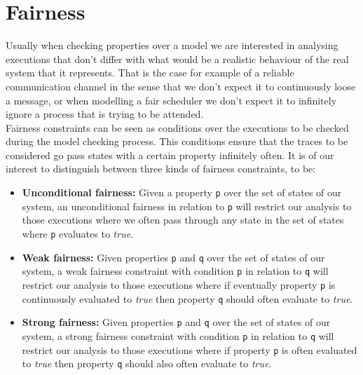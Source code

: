 \documentclass[12pt]{llncs2e/llncs}
\begin{document}


\section{Fairness}\label{fairness}

Usually when checking properties over a model we are interested in analysing 
executions that don't differ with what would be a realistic behaviour of the
real system that it represents. That is the case for example of a reliable
communication channel in the sense that we don't expect it to continuously
loose a message, or when modelling a fair scheduler we don't expect it to
infinitely ignore a process that is trying to be attended.\\
Fairness constraints can be seen as conditions over the executions to be checked
during the model checking process. This conditions ensure that the traces
to be considered go pass states with a certain property infinitely often.
It is of our interest to distinguish between three kinds of fairness
constraints, to be:
\begin{itemize}
\item \textbf{Unconditional fairness:} Given a property \texttt{p} over the
set of states of our system, an unconditional fairness in relation to
\texttt{p} will restrict our analysis to those executions where we often pass
through any state in the set of states where \texttt{p} evaluates to
\textit{true}.

\item \textbf{Weak fairness:} Given properties \texttt{p} and \texttt{q}
over the set of states of our system, a weak fairness constraint with
condition \texttt{p} in relation to \texttt{q} will restrict our analysis
to those executions where if eventually property \texttt{p} is continuously
evaluated to \textit{true} then property \texttt{q} should often evaluate
to \textit{true}.

\item \textbf{Strong fairness:} Given properties \texttt{p} and \texttt{q}
over the set of states of our system, a strong fairness constraint with
condition \texttt{p} in relation to \texttt{q} will restrict our analysis
to those executions where if property \texttt{p} is often evaluated to 
\textit{true} then property \texttt{q} should also often evaluate to
\textit{true}.

\end{itemize}
\end{document}
